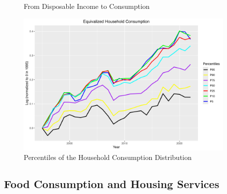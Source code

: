\documentclass{article}
\begin{document}
\begin{figure}[p]
\begin{subfigure}[t]{0.475\textwidth}
    \end{subfigure}
    \caption{From Disposable Income to Consumption}
    \label{fig:Consumption}
    \vspace{1em}
    \centering
    \includegraphics[width=0.95\textwidth]{figures/Fig_7/Fig_7_percentiles_a1995.png}
    \caption{Percentiles of the Household Consumption Distribution}
    \label{fig:Consumption_cyclic}
\end{figure}

\subsection{Food Consumption and Housing Services}
\end{document}
